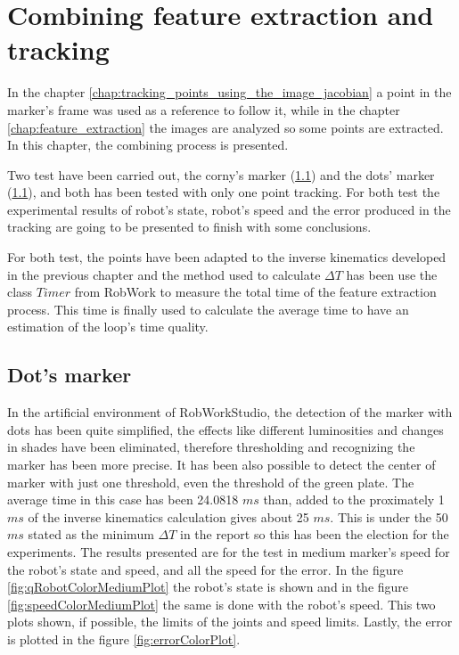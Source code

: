 









\chapter{Combining feature extraction and tracking} %
\label{chap:combining_feature_extraction_and_tracking}
	In the chapter \ref{chap:tracking_points_using_the_image_jacobian} a point in the marker's frame was used as a reference to follow it, while in the chapter \ref{chap:feature_extraction} the images are analyzed so some points are extracted. 
	In this chapter, the combining process is presented.

	Two test have been carried out, the corny's marker (\ref{sec:dot_s_marker}) and the dots' marker (\ref{sec:dot_s_marker}), and both has been tested with only one point tracking.
	For both test the experimental results of robot's state, robot's speed and the error produced in the tracking are going to be presented to finish with some conclusions.

	For both test, the points have been adapted to the inverse kinematics developed in the previous chapter and the method used to calculate $\Delta T$ has been use the class $Timer$ from RobWork to measure the total time of the feature extraction process. This time is finally used to calculate the average time to have an estimation of the loop's time quality.

	\section{Dot's marker} %
	\label{sec:dot_s_marker}
	In the artificial environment of RobWorkStudio, the detection of the marker with dots has been quite simplified, the effects like different luminosities and changes in shades have been eliminated, therefore thresholding and recognizing the marker has been more precise. It has been also possible to detect the center of marker with just one threshold, even the threshold of the green plate.
		The average time in this case has been 24.0818 $ms$ than, added to the proximately 1 $ms$ of the inverse kinematics calculation gives about 25 $ms$. 
		This is under the 50 $ms$ stated as the minimum $\Delta T$ in the report so this has been the election for the experiments. 
		The results presented are for the test in medium marker's speed for the robot's state and speed, and all the speed for the error. 
		In the figure \ref{fig:qRobotColorMediumPlot} the robot's state is shown and in the figure \ref{fig:speedColorMediumPlot} the same is done with the robot's speed. This two plots shown, if possible, the limits of the joints and speed limits. Lastly, the error is plotted in the figure \ref{fig:errorColorPlot}.
		
